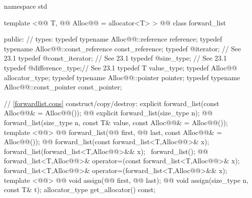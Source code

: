 \documentclass[american,twoside]{book}
\begin{document}
\begin{codeblock}
namespace std { 
  template <@@ T, @@ Alloc@@ = allocator<T> > 
  @@
  class forward_list { 
  public: 
    // types: 
    typedef typename Alloc@@::reference reference; 
    typedef typename Alloc@@::const_reference const_reference; 
    typedef @\impdef@ iterator;       // See 23.1 
    typedef @\impdef@ const_iterator; // See 23.1 
    typedef @\impdef@ size_type;      // See 23.1 
    typedef @\impdef@ difference_type;// See 23.1 
    typedef T value_type; 
    typedef Alloc@@ allocator_type; 
    typedef typename Alloc@@::pointer pointer; 
    typedef typename Alloc@@::const_pointer const_pointer; 

    // \ref{forwardlist.cons} construct/copy/destroy: 
    explicit forward_list(const Alloc@@& = Alloc@@()); 
    @@ explicit forward_list(size_type n);
    @@ 
      forward_list(size_type n, const T& value, 
                   const Alloc@@& = Alloc@@()); 
    template <@@>
      @@
      forward_list(@@ first, @@ last, 
                   const Alloc@@& = Alloc@@()); 
    @@ 
      forward_list(const forward_list<T,Alloc@@>& x);
    forward_list(forward_list<T,Alloc@@>&& x);
    ~forward_list(); 
    @@ 
      forward_list<T,Alloc@@>& operator=(const forward_list<T,Alloc@@>& x);
    forward_list<T,Alloc@@>& operator=(forward_list<T,Alloc@@>&& x); 
    template <@@> 
      @@
      void assign(@@ first, @@ last); 
    @@ void assign(size_type n, const T& t); 
    allocator_type get_allocator() const; 

}}
\end{codeblock}
\end{document}
